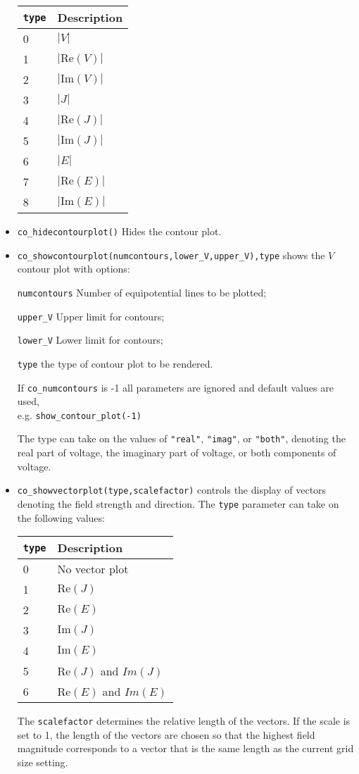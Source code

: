 \begin{itemize}
\begin{tabular}{ll}
\texttt{type} &  Description  \\ \hline
0 & $|V|$		\\
1 & $| \mbox{Re}(V)|$	\\
2 & $| \mbox{Im}(V)|$	\\
3 & $|J|$		\\
4 & $|\mbox{Re}(J)|$	\\
5 & $|\mbox{Im}(J)|$	\\
6 & $|E|$		\\
7 & $|\mbox{Re}(E)|$	\\
8 & $|\mbox{Im}(E)|$
\end{tabular}

\item \texttt{co\_hidecontourplot()} Hides the contour plot.

\item \texttt{co\_showcontourplot(numcontours,lower{\_}V,upper{\_}V),type} shows the
$V$ contour plot with options:

\texttt{numcontours} Number of equipotential lines to be plotted;

\texttt{upper{\_}V} Upper limit for contours;

\texttt{lower{\_}V} Lower limit for contours;

\texttt{type} the type of contour plot to be rendered.

If \texttt{co\_numcontours} is -1 all parameters are ignored and
default values are used, \\ e.g. \texttt{show{\_}contour{\_}plot(-1)}

The type can take on the values of {\tt "real"}, {\tt "imag"}, or {\tt "both"}, denoting
the real part of voltage, the imaginary part of voltage, or both components of voltage.

\item \texttt{co\_showvectorplot(type,scalefactor)}
controls the display of vectors denoting the field strength and
direction. The \texttt{type} parameter can take on the following values:

\begin{tabular}{ll}
\texttt{type} &  Description  \\ \hline
0 & No vector plot \\
1 & $\mbox{Re}(J)$ \\
2 & $\mbox{Re}(E)$ \\
3 & $\mbox{Im}(J)$ \\
4 & $\mbox{Im}(E)$ \\
5 & $\mbox{Re}(J)$ and $Im(J)$ \\
6 & $\mbox{Re}(E)$ and $Im(E)$
\end{tabular}
The \texttt{scalefactor}
determines the relative length of the vectors. If the scale is set
to 1, the length of the vectors are chosen so that the highest field
magnitude corresponds to a vector that is the same length as the
current grid size setting.


\end{itemize}
